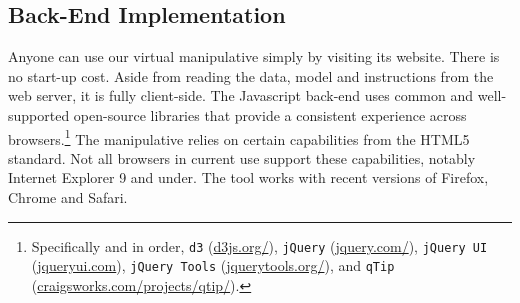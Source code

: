 \documentclass[11pt,letterpaper]{article}
\newcommand{\Note}[1]{}
\renewcommand{\Note}[1]{\hl{[#1]}}  %
\newcommand{\NoteSigned}[3]{{\sethlcolor{#2}\Note{#1: #3}}}
\newcommand{\NoteFF}[1]{\NoteSigned{FF}{LightBlue}{#1}}
\newcommand{\NoteJE}[1]{\NoteSigned{JE}{LightGreen}{#1}}
\begin{document}
\subsection{Back-End Implementation}\label{sec:backend}
Anyone can use our virtual manipulative simply by visiting its website.
There is no start-up cost.
Aside from reading the data, model and instructions from the web server, it is fully 
client-side. The Javascript back-end uses common and well-supported open-source 
libraries 
that provide a consistent experience across browsers.\footnote{Specifically and in order, 
\texttt{d3} (\url{d3js.org/}),
\texttt{jQuery} (\url{jquery.com/}), 
\texttt{jQuery UI} (\url{jqueryui.com}),
\texttt{jQuery Tools} (\url{jquerytools.org/}), and
\texttt{qTip} (\url{craigsworks.com/projects/qtip/}).}
The manipulative relies on certain capabilities from the HTML5
standard.  Not all browsers in current use support these
capabilities, notably Internet Explorer 9 and under.
The tool works with recent versions of Firefox, Chrome and Safari.
%


%
%
%
\end{document}
